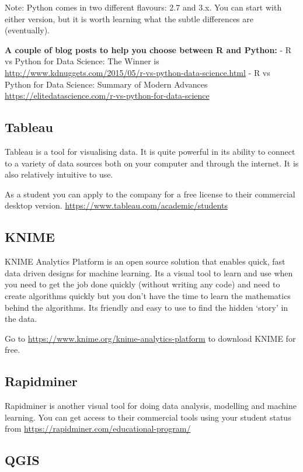 \documentclass[]{book}
\theoremstyle{definition}
\theoremstyle{definition}
\theoremstyle{remark}
\begin{document}
Note: Python comes in two different flavours: 2.7 and 3.x. You can start
with either version, but it is worth learning what the subtle
differences are (eventually).

\textbf{A couple of blog posts to help you choose between R and Python:}
- R vs Python for Data Science: The Winner is
\url{http://www.kdnuggets.com/2015/05/r-vs-python-data-science.html} - R
vs Python for Data Science: Summary of Modern Advances
\url{https://elitedatascience.com/r-vs-python-for-data-science}

\subsection{Tableau}\label{tableau}

Tableau is a tool for visualising data. It is quite powerful in its
ability to connect to a variety of data sources both on your computer
and through the internet. It is also relatively intuitive to use.

As a student you can apply to the company for a free license to their
commercial desktop version.
\url{https://www.tableau.com/academic/students}

\subsection{KNIME}\label{knime}

KNIME Analytics Platform is an open source solution that enables quick,
fast data driven designs for machine learning. Its a visual tool to
learn and use when you need to get the job done quickly (without writing
any code) and need to create algorithms quickly but you don't have the
time to learn the mathematics behind the algorithms. Its friendly and
easy to use to find the hidden `story' in the data.

Go to \url{https://www.knime.org/knime-analytics-platform} to download
KNIME for free.

\subsection{Rapidminer}\label{rapidminer}

Rapidminer is another visual tool for doing data analysis, modelling and
machine learning. You can get access to their commercial tools using
your student status from
\url{https://rapidminer.com/educational-program/}

\subsection{QGIS}\label{qgis}
\end{document}
